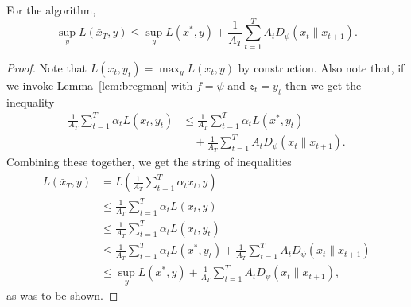 \documentclass[paper.tex]{subfiles}
\begin{document}
\begin{proposition}
\label{prop:method-1}
For the \primal algorithm, 
\begin{equation}
\sup_{y} L(\bar{x}_T, y) \leq \sup_{y} L(x^*, y) + \frac{1}{A_T} \sum_{t=1}^T A_tD_\psi(x_t \| x_{t+1}).
\end{equation}
\end{proposition}
\begin{proof}
Note that $L(x_t, y_t) = \max_{y} L(x_t, y)$ by construction. 
Also note that, if we invoke Lemma~\ref{lem:bregman} with $f = \psi$ and 
$z_t = y_t$ then we get the inequality
\begin{align}
\frac{1}{A_T} \sum_{t=1}^T \alpha_t L(x_t, y_t) 
&\leq \frac{1}{A_T} \sum_{t=1}^T \alpha_t L(x^*, y_t) \\
&\quad + \frac{1}{A_T} \sum_{t=1}^T A_tD_\psi(x_t \| x_{t+1}). \nonumber
\end{align}
Combining these together, we get the string of inequalities
\begin{align*}
L(\bar{x}_T, y) 
 &= L\left(\frac{1}{A_T} \sum_{t=1}^T \alpha_tx_t, y\right) \\
 &\leq \frac{1}{A_T} \sum_{t=1}^T \alpha_t L(x_t, y) \\
 &\leq \frac{1}{A_T} \sum_{t=1}^T \alpha_t L(x_t, y_t) \\
 &\leq \frac{1}{A_T} \sum_{t=1}^T \alpha_t L(x^*, y_t) + \frac{1}{A_T} \sum_{t=1}^T A_t D_\psi(x_t \| x_{t+1}) \\
 &\leq \sup_{y} L(x^*, y) + \frac{1}{A_T} \sum_{t=1}^T A_tD_\psi(x_t \| x_{t+1}),
\end{align*}
as was to be shown.
\end{proof}
\end{document}
